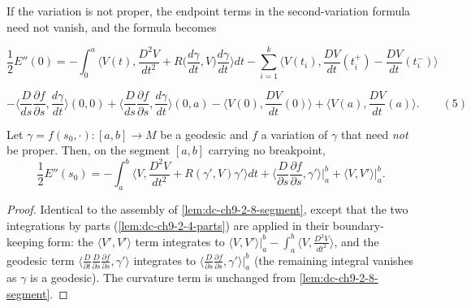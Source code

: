 \begin{remark}
  \label{rem:dc-ch9-2-9}
  If the variation is not proper, the endpoint terms in the second-variation
  formula need not vanish, and the formula becomes

  $$
  \frac{1}{2}E''(0)=-\int_0^a\Big\langle V(t),\frac{D^2 V}{dt^2}+R\Big(\frac{d\gamma}{dt},V\Big)\frac{d\gamma}{dt}\Big\rangle dt-\sum_{i=1}^k\Big\langle V(t_i),\frac{DV}{dt}(t_i^+)-\frac{DV}{dt}(t_i^-)\Big\rangle
  $$

  $$
  -\Big\langle\frac{D}{ds}\frac{\partial f}{\partial s},\frac{d\gamma}{dt}\Big\rangle(0,0)+\Big\langle\frac{D}{ds}\frac{\partial f}{\partial s},\frac{d\gamma}{dt}\Big\rangle(0,a)-\Big\langle V(0),\frac{DV}{dt}(0)\Big\rangle+\Big\langle V(a),\frac{DV}{dt}(a)\Big\rangle.\qquad(5)
  $$
\end{remark}
\begin{lemma}
  \label{lem:dc-ch9-2-9-segment}
  \leanok
  Let $\gamma=f(s_0,\cdot):[a,b]\to M$ be a geodesic and $f$ a variation of $\gamma$ that need
  \emph{not} be proper. Then, on the segment $[a,b]$ carrying no breakpoint,
  $$
  \frac{1}{2}E''(s_0)=-\int_a^b\Big\langle V,\frac{D^2 V}{dt^2}+R(\gamma',V)\gamma'\Big\rangle dt
    +\Big\langle\frac{D}{\partial s}\frac{\partial f}{\partial s},\gamma'\Big\rangle\Big|_a^b
    +\big\langle V,V'\big\rangle\Big|_a^b .
  $$

\end{lemma}
\begin{proof}
  \leanok
  \sketch
  Identical to the assembly of \cref{lem:dc-ch9-2-8-segment}, except that the two integrations
  by parts (\cref{lem:dc-ch9-2-4-parts}) are applied in their boundary-keeping form: the
  $\langle V',V'\rangle$ term integrates to
  $\langle V,V'\rangle|_a^b-\int_a^b\langle V,\frac{D^2V}{dt^2}\rangle$, and the geodesic term
  $\langle\frac{D}{\partial t}\frac{D}{\partial s}\frac{\partial f}{\partial s},\gamma'\rangle$
  integrates to $\langle\frac{D}{\partial s}\frac{\partial f}{\partial s},\gamma'\rangle|_a^b$
  (the remaining integral vanishes as $\gamma$ is a geodesic). The curvature term is unchanged
  from \cref{lem:dc-ch9-2-8-segment}.
\end{proof}
